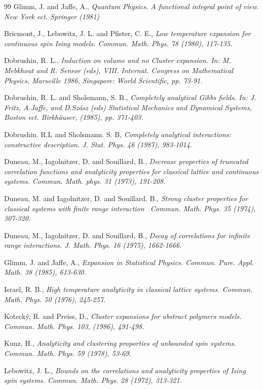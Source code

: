 \documentclass{article}
\begin{document}
\begin{thebibliography}{99}
\bibitem{} Glimm, J. and Jaffe, A., \textit{Quantum Physics. A functional
integral point of view. New York ect. Springer (1981)}

\bibitem{} Bricmont, J., Lebowitz, J. L. and Pfister, C. E., \textit{Low
temperature expansion for continuous spin Ising models. Commun. Math. Phys.
78 (1980), 117-135.}

\bibitem{} Dobrushin, R. L., \textit{Induction on volume and no Cluster
expansion. In: M. Mebkhout and R. Seneor (eds), VIII. Internat. Congress on
Mathematical Physics, Marseille 1986, Singapore: World Scientific, pp. 73-91.%
}

\bibitem{} Dobrushin, R. L. and Sholsmann, S. B., \textit{Completely
analytical Gibbs fields. In: J. Fritz, A.Jaffe, and D.Sz\'{a}sz (eds)
Statistical Mechanics and Dynamical Systems, Boston ect. Birkh\"{a}user,
(1985), pp. 371-403.}

\bibitem{} Dobrushin. R.L and Sholsmann. S. B, \textit{Completely analytical
interactions: constructive description. J. Stat. Phys. 46 (1987), 983-1014.}

\bibitem{} Duneau, M., Iagolnitzer, D. and Souillard, B., \textit{Decrease
properties of truncated correlation functions and analyticity properties for
classical lattice and continuous systems. Commun. Math. phys. 31 (1973),
191-208.}

\bibitem{} Duneau, M. and Iagolnitzer, D. and Souillard. B., \textit{Strong
cluster properties for classical systems with finite range interaction \
Commun. Math. Phys. 35 (1974), 307-320.}

\bibitem{} Duneau, M., Iagolnitzer, D. and Souillard, B., \textit{Decay of
correlations for infinite range interactions. J. Math. Phys. 16 (1975),
1662-1666.}

\bibitem{} Glimm, J. and Jaffe, A., \textit{Expansion in Statistical
Physics. Commun. Pure. Appl. Math. 38 (1985), 613-630.}

\bibitem{} Israel, R. B., \textit{High temperature analyticity in classical
lattice systems. Commun. Math. Phys. 50 (1976), 245-257.}

\bibitem{} Koteck\'{y}, R. and Preiss, D., \textit{Cluster expansions for
abstract polymers models. Commun. Math. Phys. 103, (1986), 491-498.}

\bibitem{} Kunz, H., \textit{Analyticity and clustering proporties of
unbounded spin systems. Commun. Math. Phys. 59 (1978), 53-69.}

\bibitem{} Lebowitz, J. L., \textit{Bounds on the correlations and
analyticity properties of Ising spin systems. Commun. Math. Phys. 28 (1972),
313-321.}


\end{thebibliography}
\end{document}
